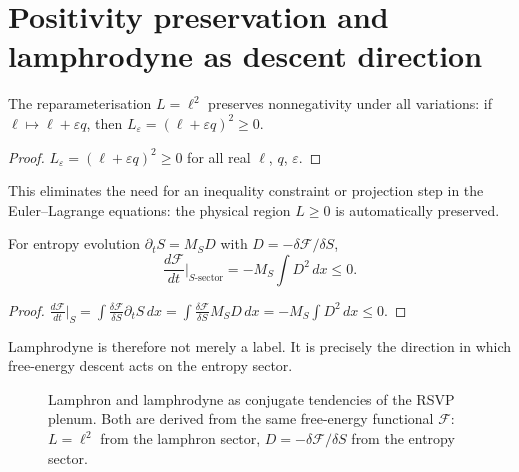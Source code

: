 \section{Positivity preservation and lamphrodyne as descent direction}

\begin{proposition}
  \label{prop:positivity-variation}
  \statusproven{}
  The reparameterisation $L = \ell^2$ preserves nonnegativity
  under all variations: if $\ell \mapsto \ell + \varepsilon q$,
  then $L_\varepsilon = (\ell + \varepsilon q)^2 \geq 0$.
\end{proposition}

\begin{proof}
  $L_\varepsilon = (\ell + \varepsilon q)^2 \geq 0$ for all
  real $\ell$, $q$, $\varepsilon$.
\end{proof}

This eliminates the need for an inequality constraint or
projection step in the Euler--Lagrange equations: the
physical region $L \geq 0$ is automatically preserved.

\begin{proposition}
  \label{prop:lamphrodyne-descent}
  \statusproven{}
  For entropy evolution $\partial_t S = M_S D$ with
  $D = -\delta\mathcal{F}/\delta S$,
  \[
    \frac{d\mathcal{F}}{dt}\big|_{S\text{-sector}}
    = -M_S\int D^2\,dx \leq 0.
  \]
\end{proposition}

\begin{proof}
  $\frac{d\mathcal{F}}{dt}\big|_S
  = \int\frac{\delta\mathcal{F}}{\delta S}\partial_t S\,dx
  = \int\frac{\delta\mathcal{F}}{\delta S}M_S D\,dx
  = -M_S\int D^2\,dx \leq 0$.
\end{proof}

Lamphrodyne is therefore not merely a label.
It is precisely the direction in which free-energy descent
acts on the entropy sector.


\begin{figure}[ht]
\centering
{}
\caption{Lamphron and lamphrodyne as conjugate tendencies of the
         RSVP plenum.
         Both are derived from the same free-energy functional
         $\mathcal{F}$: $L=\ell^2$ from the lamphron sector,
         $D = -\delta\mathcal{F}/\delta S$ from the entropy sector.}
\label{fig:lamp-duality}
\end{figure}

